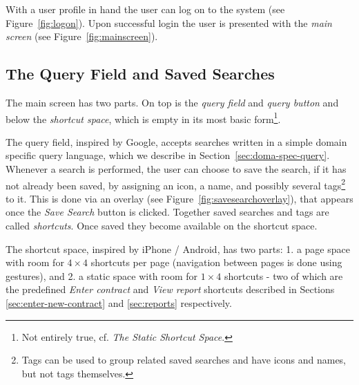 \documentclass[envcountsame]{llncs}
\begin{document}
With a user profile in hand the user can log on to the system (see
Figure~\ref{fig:logon}). Upon successful login the user is presented
with the \emph{main screen} (see Figure~\ref{fig:mainscreen}).

\subsection{The Query Field and Saved Searches}
\label{sec:query-field}
The main screen has two parts. On top is the \emph{query field} and
\emph{query button} and below the \emph{shortcut space}, which is
empty in its most basic form\footnote{Not entirely true, cf. \emph{The
    Static Shortcut Space}.}.

The query field, inspired by Google, accepts searches written in a
simple domain specific query language, which we describe in
Section~\ref{sec:doma-spec-query}. Whenever a search is performed, the
user can choose to save the search, if it has not already been saved,
by assigning an icon, a name, and possibly several tags\footnote{Tags
  can be used to group related saved searches and have icons and
  names, but not tags themselves.} to it. This is done via an overlay
(see Figure~\ref{fig:savesearchoverlay}), that appears once the
\emph{Save Search} button is clicked. Together saved searches and tags
are called \emph{shortcuts}. Once saved they become available on the
shortcut space.

The shortcut space, inspired by iPhone / Android, has two parts: 1. a
page space with room for $4\times 4$ shortcuts per page (navigation
between pages is done using gestures), and 2. a static space with room
for $1\times 4$ shortcuts - two of which are the predefined
\emph{Enter contract} and \emph{View report} shortcuts described in
Sections \ref{sec:enter-new-contract} and \ref{sec:reports}
respectively.
\end{document}
